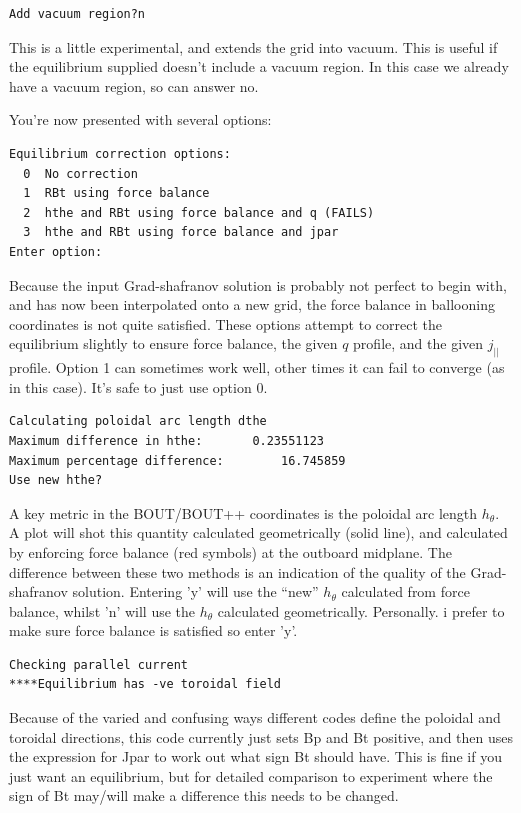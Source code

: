 \documentclass[12pt]{article}
\begin{document}
\begin{verbatim}
Add vacuum region?n
\end{verbatim}
This is a little experimental, and extends the grid into vacuum. This is useful if the equilibrium supplied doesn't include a vacuum region. In this case we already have a vacuum region, so can answer no.

You're now presented with several options:
\begin{verbatim}
Equilibrium correction options:
  0  No correction
  1  RBt using force balance
  2  hthe and RBt using force balance and q (FAILS)
  3  hthe and RBt using force balance and jpar
Enter option:
\end{verbatim}
Because the input Grad-shafranov solution is probably not perfect to begin with, and has now been interpolated onto a new grid, the force balance in ballooning coordinates is not quite satisfied. These options attempt to correct the equilibrium slightly to ensure force balance, the given $q$ profile, and the given $j_{||}$ profile. Option 1 can sometimes work well, other times it can fail to converge (as in this case). It's safe to just use option 0.

\begin{verbatim}
Calculating poloidal arc length dthe
Maximum difference in hthe:       0.23551123
Maximum percentage difference:        16.745859
Use new hthe?
\end{verbatim}
A key metric in the BOUT/BOUT++ coordinates is the poloidal arc length $h_\theta$. A plot will shot this quantity calculated geometrically (solid line), and calculated by enforcing force balance (red symbols) at the outboard midplane.
The difference between these two methods is an indication of the quality of the Grad-shafranov solution. Entering 'y' will use the ``new'' $h_\theta$ calculated from force balance, whilst 'n' will use the $h_\theta$ calculated geometrically. Personally. i prefer to make sure force balance is satisfied so enter 'y'.

\begin{verbatim}
Checking parallel current
****Equilibrium has -ve toroidal field
\end{verbatim}
Because of the varied and confusing ways different codes define the poloidal
and toroidal directions, this code currently just sets Bp and Bt positive,
and then uses the expression for Jpar to work out what sign Bt should have.
This is fine if you just want an equilibrium, but for detailed comparison to
experiment where the sign of Bt may/will make a difference this needs to be
changed.
\end{document}

